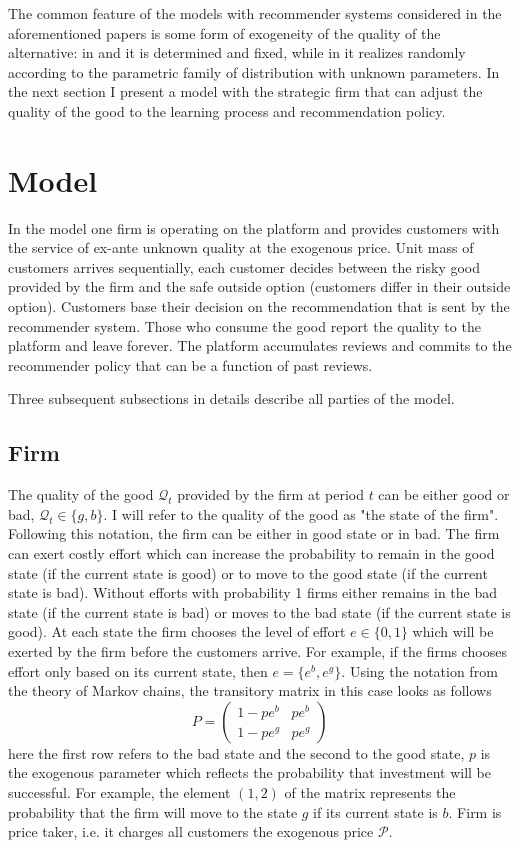 \documentclass[a4paper]{article}
\begin{document}
	
	
	The common feature of the models with recommender systems considered in the aforementioned papers is some form of exogeneity of the quality of the alternative: in \cite{kremer2014} and \cite{che2015} it is determined and fixed, while in \cite{papanastasiou2017} it realizes randomly according to the parametric family of distribution with unknown parameters. In the next section I present a model with the strategic firm that can adjust the quality of the good to the learning process and recommendation policy.
	
	\section{Model}
	In the model one firm is operating on the platform and provides customers with the service of ex-ante unknown quality at the exogenous price. Unit mass of customers arrives sequentially, each customer decides between the risky good provided by the firm and the safe outside option (customers differ in their outside option). Customers base their decision on the recommendation that is sent by the recommender system. Those who consume the good report the quality to the platform and leave forever. The platform accumulates reviews and commits to the recommender policy that can be a function of past reviews.
	
	
	
	Three subsequent subsections in details describe all parties of the model.
	\subsection{Firm}
	The quality of the good $\mathcal{Q}_t$ provided by the firm at period $t$ can be either good or bad, $\mathcal{Q}_t \in \{g, b\}$. I will refer to the quality of the good as "the state of the firm". Following this notation, the firm can be either in good state or in bad. The firm can exert costly effort which can increase the probability to remain in the good state (if the current state is good) or to move to the good state (if the current state is bad). Without efforts with probability 1 firms either remains in the bad state (if the current state is bad) or moves to the bad state (if the current state is good). At each state the firm chooses the level of effort $e\in\{0, 1\}$ which will be exerted by the firm before the customers arrive. For example, if the firms chooses effort only based on its current state, then $e = \{e^b, e^g\}$. Using the notation from the theory of Markov chains, the transitory matrix in this case looks as follows $$P = \begin{pmatrix}
	1 - pe^{b} & pe^{b}\\
	1-pe^{g} & pe^{g}
	\end{pmatrix}$$
	here the first row refers to the bad state and the second to the good state, $p$ is the exogenous parameter which reflects the probability that investment will be successful. For example, the element $(1, 2)$ of the matrix represents the probability that the firm will move to the state $g$ if its current state is $b$. Firm is price taker, i.e. it charges all customers the exogenous price $\mathcal{P}$.
	
\end{document}
